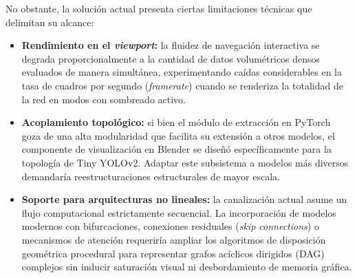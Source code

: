 No obstante, la solución actual presenta ciertas limitaciones técnicas que delimitan su alcance:
\begin{itemize}
    \item \textbf{Rendimiento en el \textit{viewport}:} la fluidez de navegación interactiva se degrada proporcionalmente a la cantidad de datos 
    volumétricos densos evaluados de manera simultánea, experimentando caídas considerables en la tasa de cuadros por segundo (\textit{framerate}) 
    cuando se renderiza la totalidad de la red en modos con sombreado activo.
    \item \textbf{Acoplamiento topológico:} si bien el módulo de extracción en PyTorch goza de una alta modularidad que facilita su extensión 
    a otros modelos, el componente de visualización en Blender se diseñó específicamente para la topología de Tiny YOLOv2. Adaptar este 
    subsistema a modelos más diversos demandaría reestructuraciones estructurales de mayor escala.
    \item \textbf{Soporte para arquitecturas no lineales:} la canalización actual asume un flujo computacional estrictamente secuencial. 
    La incorporación de modelos modernos con bifurcaciones, conexiones residuales (\textit{skip connections}) o mecanismos de atención 
    requeriría ampliar los algoritmos de disposición geométrica procedural para representar grafos acíclicos dirigidos (DAG) 
    complejos sin inducir saturación visual ni desbordamiento de memoria gráfica.
\end{itemize}